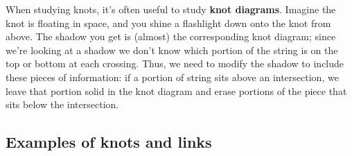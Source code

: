 \documentclass[12 pt]{article}
\begin{document}
When studying knots, it's often useful to study \textbf{knot diagrams}. Imagine the knot is floating in space, and you shine a flashlight down onto the knot from above. The shadow you get is (almost) the corresponding knot diagram; since we're looking at a shadow we don't know which portion of the string is on the top or bottom at each crossing. Thus, we need to modify the shadow to include these pieces of information: if a portion of string sits above an intersection, we leave that portion solid in the knot diagram and erase portions of the piece that sits below the intersection.

\subsection{Examples of knots and links}
\end{document}
